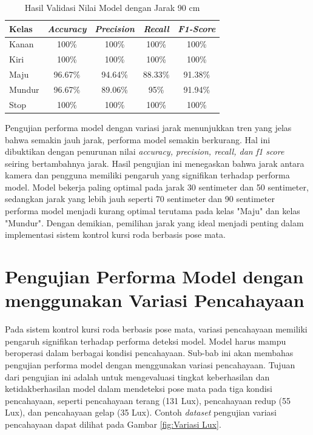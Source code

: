 \begin{longtable}{|l|c|c|c|c|}
  \caption{Hasil Validasi Nilai Model dengan Jarak 90 cm}
  \label{tb:vs_model6} \\
  \hline
  \rowcolor[HTML]{C0C0C0} 
  \textbf{Kelas} & \textbf{\emph{Accuracy}} & \textbf{\emph{Precision}} & \textbf{\emph{Recall}} & \textbf{\emph{F1-Score}} \\ \hline
  Kanan    & 100\%            & 100\%             & 100\%           & 100\%            \\ \hline
  Kiri     & 100\%          & 100\%           & 100\%           & 100\%           \\ \hline
  Maju      & 96.67\%          & 94.64\%           & 88.33\%          & 91.38\%          \\ \hline
  Mundur     & 96.67\%            & 89.06\%             & 95\%           & 91.94\%            \\ \hline
  Stop  & 100\%            & 100\%             & 100\%           & 100\%            \\ \hline
\end{longtable}

Pengujian performa model dengan variasi jarak menunjukkan tren yang jelas bahwa semakin jauh jarak, performa model semakin berkurang. Hal ini dibuktikan dengan penurunan nilai \emph{accuracy, precision, recall, dan f1 score} seiring bertambahnya jarak. Hasil pengujian ini menegaskan bahwa jarak antara kamera dan pengguna memiliki pengaruh yang signifikan terhadap performa model. Model bekerja paling optimal pada jarak 30 sentimeter dan 50 sentimeter, sedangkan jarak yang lebih jauh seperti 70 sentimeter dan 90 sentimeter performa model menjadi kurang optimal terutama pada kelas "Maju" dan kelas "Mundur". Dengan demikian, pemilihan jarak yang ideal menjadi penting dalam implementasi sistem kontrol kursi roda berbasis pose mata.

\section{Pengujian Performa Model dengan menggunakan Variasi Pencahayaan}

Pada sistem kontrol kursi roda berbasis pose mata, variasi pencahayaan memiliki pengaruh signifikan terhadap performa deteksi model. Model harus mampu beroperasi dalam berbagai kondisi pencahayaan. Sub-bab ini akan membahas pengujian performa model dengan menggunakan variasi pencahayaan. Tujuan dari pengujian ini adalah untuk mengevaluasi tingkat keberhasilan dan ketidakberhasilan model dalam mendeteksi pose mata pada tiga kondisi pencahayaan, seperti pencahayaan terang (131 Lux), pencahayaan redup (55 Lux), dan pencahayaan gelap (35 Lux). Contoh \emph{dataset} pengujian variasi pencahayaan dapat dilihat pada Gambar \ref{fig:Variasi Lux}.

